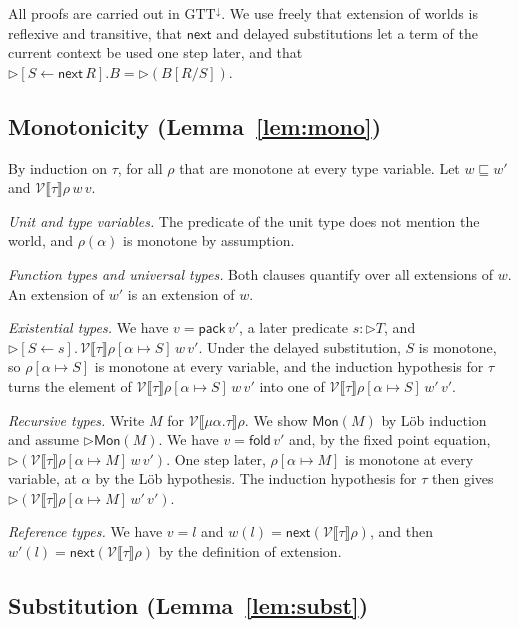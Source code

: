 \documentclass[acmsmall,nonacm,screen]{acmart}
\newcommand{\later}{{\triangleright}}
\newcommand{\nxt}{\mathsf{next}}
\newcommand{\sem}[1]{\llbracket #1 \rrbracket}
\newcommand{\kw}[1]{\mathsf{#1}}
\newcommand{\dsub}[2]{[#1 \leftarrow #2]}
\newcommand{\Pred}{T}
\newcommand{\Mon}{\mathsf{Mon}}
\newcommand{\Vr}{\mathcal{V}}
\newcommand{\ext}{\sqsubseteq}
\begin{document}
All proofs are carried out in $\mathrm{GTT}^{\downarrow}$. We use freely that extension of
worlds is reflexive and transitive, that $\nxt$ and delayed substitutions let a term of the
current context be used one step later, and that
$\later\dsub{S}{\nxt\,R}.B = \later(B[R/S])$.

\subsection{Monotonicity (Lemma~\ref{lem:mono})}

By induction on $\tau$, for all $\rho$ that are monotone at every type variable. Let
$w \ext w'$ and $\Vr\sem{\tau}\rho\,w\,v$.

\emph{Unit and type variables.} The predicate of the unit type does not mention the world,
and $\rho(\alpha)$ is monotone by assumption.

\emph{Function types and universal types.} Both clauses quantify over all extensions of
$w$. An extension of $w'$ is an extension of $w$.

\emph{Existential types.} We have $v = \kw{pack}\,v'$, a later predicate $s : \later\Pred$,
and $\later\dsub{S}{s}.\,\Vr\sem{\tau}\rho[\alpha \mapsto S]\,w\,v'$. Under the delayed
substitution, $S$ is monotone, so $\rho[\alpha \mapsto S]$ is monotone at every variable,
and the induction hypothesis for $\tau$ turns the element of
$\Vr\sem{\tau}\rho[\alpha \mapsto S]\,w\,v'$ into one of
$\Vr\sem{\tau}\rho[\alpha \mapsto S]\,w'\,v'$.

\emph{Recursive types.} Write $M$ for $\Vr\sem{\mu\alpha.\tau}\rho$. We show $\Mon(M)$ by
L\"ob induction and assume $\later\Mon(M)$. We have $v = \kw{fold}\,v'$ and, by the fixed
point equation, $\later(\Vr\sem{\tau}\rho[\alpha \mapsto M]\,w\,v')$. One step later,
$\rho[\alpha \mapsto M]$ is monotone at every variable, at $\alpha$ by the L\"ob hypothesis.
The induction hypothesis for $\tau$ then gives
$\later(\Vr\sem{\tau}\rho[\alpha \mapsto M]\,w'\,v')$.

\emph{Reference types.} We have $v = l$ and $w(l) = \nxt(\Vr\sem{\tau}\rho)$, and then
$w'(l) = \nxt(\Vr\sem{\tau}\rho)$ by the definition of extension.

\subsection{Substitution (Lemma~\ref{lem:subst})}
\end{document}

